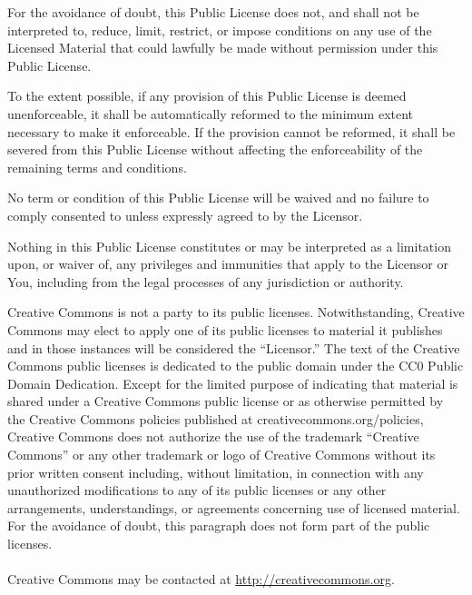 	\begin{ccEnumerate}
		\item For the avoidance of doubt, this Public License does not, and shall not be interpreted to, reduce, limit, restrict, or impose conditions on any use of the Licensed Material that could lawfully be made without permission under this Public License.
		\item To the extent possible, if any provision of this Public License is deemed unenforceable, it shall be automatically reformed to the minimum extent necessary to make it enforceable. If the provision cannot be reformed, it shall be severed from this Public License without affecting the enforceability of the remaining terms and conditions.
		\item No term or condition of this Public License will be waived and no failure to comply consented to unless expressly agreed to by the Licensor.
		\item Nothing in this Public License constitutes or may be interpreted as a limitation upon, or waiver of, any privileges and immunities that apply to the Licensor or You, including from the legal processes of any jurisdiction or authority.
	\end{ccEnumerate}
	\par Creative Commons is not a party to its public licenses. Notwithstanding, Creative Commons may elect to apply one of its public licenses to material it publishes and in those instances will be considered the “Licensor.” The text of the Creative Commons public licenses is dedicated to the public domain under the CC0 Public Domain Dedication. Except for the limited purpose of indicating that material is shared under a Creative Commons public license or as otherwise permitted by the Creative Commons policies published at creativecommons.org/policies, Creative Commons does not authorize the use of the trademark “Creative Commons” or any other trademark or logo of Creative Commons without its prior written consent including, without limitation, in connection with any unauthorized modifications to any of its public licenses or any other arrangements, understandings, or agreements concerning use of licensed material. For the avoidance of doubt, this paragraph does not form part of the public licenses.\\\\
	Creative Commons may be contacted at \url{http://creativecommons.org}.
	
	

